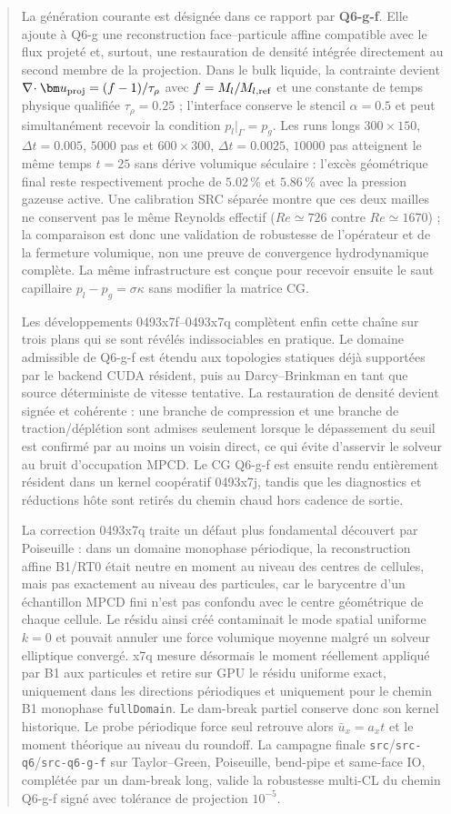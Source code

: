 \documentclass[11pt,a4paper]{article}
\begin{document}
\begin{abstract}
La génération courante est désignée dans ce rapport par \textbf{Q6-g-f}. Elle ajoute à Q6-g une reconstruction face--particule affine compatible avec le flux projeté et, surtout, une restauration de densité intégrée directement au second membre de la projection. Dans le bulk liquide, la contrainte devient $\nabla\!\cdot\bm u_{\rm proj}=(f-1)/\tau_\rho$ avec $f=M_l/M_{l,\rm ref}$ et une constante de temps physique qualifiée $\tau_\rho=0.25$ ; l'interface conserve le stencil $\alpha=0.5$ et peut simultanément recevoir la condition $p_l|_\Gamma=p_g$. Les runs longs $300\times150$, $\Delta t=0.005$, $5000$ pas et $600\times300$, $\Delta t=0.0025$, $10000$ pas atteignent le même temps $t=25$ sans dérive volumique séculaire : l'excès géométrique final reste respectivement proche de $5.02\,\%$ et $5.86\,\%$ avec la pression gazeuse active. Une calibration SRC séparée montre que ces deux mailles ne conservent pas le même Reynolds effectif ($Re\simeq726$ contre $Re\simeq1670$) ; la comparaison est donc une validation de robustesse de l'opérateur et de la fermeture volumique, non une preuve de convergence hydrodynamique complète. La même infrastructure est conçue pour recevoir ensuite le saut capillaire $p_l-p_g=\sigma\kappa$ sans modifier la matrice CG.


Les développements 0493x7f--0493x7q complètent enfin cette chaîne sur trois plans qui se sont révélés indissociables en pratique. Le domaine admissible de Q6-g-f est étendu aux topologies statiques déjà supportées par le backend CUDA résident, puis au Darcy--Brinkman en tant que source déterministe de vitesse tentative. La restauration de densité devient signée et cohérente : une branche de compression et une branche de traction/déplétion sont admises seulement lorsque le dépassement du seuil est confirmé par au moins un voisin direct, ce qui évite d'asservir le solveur au bruit d'occupation MPCD. Le CG Q6-g-f est ensuite rendu entièrement résident dans un kernel coopératif 0493x7j, tandis que les diagnostics et réductions hôte sont retirés du chemin chaud hors cadence de sortie.

La correction 0493x7q traite un défaut plus fondamental découvert par Poiseuille : dans un domaine monophase périodique, la reconstruction affine B1/RT0 était neutre en moment au niveau des centres de cellules, mais pas exactement au niveau des particules, car le barycentre d'un échantillon MPCD fini n'est pas confondu avec le centre géométrique de chaque cellule. Le résidu ainsi créé contaminait le mode spatial uniforme $k=0$ et pouvait annuler une force volumique moyenne malgré un solveur elliptique convergé. x7q mesure désormais le moment réellement appliqué par B1 aux particules et retire sur GPU le résidu uniforme exact, uniquement dans les directions périodiques et uniquement pour le chemin B1 monophase \texttt{fullDomain}. Le dam-break partiel conserve donc son kernel historique. Le probe périodique force seul retrouve alors $\bar u_x=a_xt$ et le moment théorique au niveau du roundoff. La campagne finale \texttt{src}/\texttt{src-q6}/\texttt{src-q6-g-f} sur Taylor--Green, Poiseuille, bend-pipe et same-face IO, complétée par un dam-break long, valide la robustesse multi-CL du chemin Q6-g-f signé avec tolérance de projection $10^{-5}$.


\end{abstract}
\end{document}
